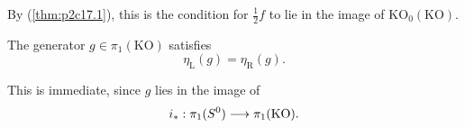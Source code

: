 \documentclass[../main]{subfiles}
\begin{document}
By (\ref{thm:p2c17.1}), this is the condition for $\frac 12 f$ to lie in the image of $\mathrm{KO}_0(\mathrm{KO})$.


\setcounter{theorem}{9} %
\begin{proposition}
\label{prop:p2ch17.10}
The generator $g\in \pi_1(\mathrm{KO})$ satisfies
\[
\eta_{\mathrm L}(g) = \eta_{\mathrm R}(g).
\]
\end{proposition}

This is immediate, since $g$ lies in the image of
\[
i_\ast: \pi_1(S^0) \lar{} \pi_1(\mathrm{KO}).
\]
\end{document}

